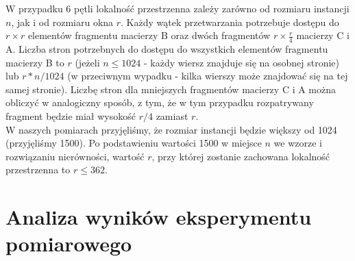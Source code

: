 \documentclass[10pt,a4paper]{article}
\begin{document}
W przypadku 6 pętli lokalność przestrzenna zależy zarówno od rozmiaru instancji $n$, jak i od rozmiaru 
okna $r$. Każdy wątek przetwarzania potrzebuje dostępu do $r \times r$ elementów fragmentu macierzy B oraz
dwóch fragmentów $r \times \frac{r}{4}$ macierzy C i A. Liczba stron potrzebnych do dostępu do wszystkich 
elementów fragmentu macierzy B to $r$ (jeżeli $n \leq 1024$ - każdy wiersz znajduje się na osobnej stronie) 
lub $r*n / 1024$ (w przeciwnym wypadku - kilka wierszy może znajdować się na tej samej stronie). Liczbę stron 
dla mniejszych fragmentów macierzy C i A można obliczyć w analogiczny sposób, z tym, że w tym przypadku rozpatrywany
fragment będzie miał wysokość $r/4$ zamiast $r$.\\

W naszych pomiarach przyjęliśmy, że rozmiar instancji będzie większy od 1024 (przyjęliśmy 1500).
Po podstawieniu wartości 1500 w miejsce $n$ we wzorze i rozwiązaniu nierówności, wartość $r$, przy której 
zostanie zachowana lokalność przestrzenna to $r \leq 362$.
\\
\section{Analiza wyników eksperymentu pomiarowego}
\end{document}
